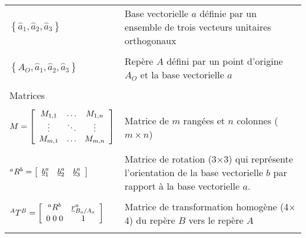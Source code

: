 \begin{center}
\begin{tabular}{p{5cm}  p{9cm}}
		$\left\{ \hat{a}_1 , \hat{a}_2 , \hat{a}_3 \right\}$  & Base vectorielle $a$ définie par un ensemble de trois vecteurs unitaires orthogonaux \\   &  \\
		$\left\{ A_O , \hat{a}_1 , \hat{a}_2 , \hat{a}_3 \right\}$  & Repère $A$ défini par un point d'origine $A_O$ et la base vectorielle $a$ \\   &  \\
		\multicolumn{2}{l}{Matrices} \\ \hline \\
		$M=\left[ \begin{array}{c c c}
					  M_{1,1} & \hdots & M_{1,n}  \\ \vdots & \ddots & \vdots \\ M_{m,1}  & \hdots & M_{m,n}
		\end{array}  \right] $
		& Matrice de $m$ rangées et $n$ colonnes ($m \times n$) \\   &  \\
		${}^aR^b = \left[ \begin{array}{c c c}
							  \underline{b}_1^a  & \underline{b}_2^a & \underline{b}_3^a
		\end{array}  \right]$            & Matrice de rotation (3$\times$3) qui représente l'orientation de la base vectorielle $b$ par rapport à la base vectorielle $a$. %
		\\   &  \\
		$^{A}T^B = \left[ \begin{array}{c c}
		{}^aR^b  & \underline{r}^a_{B_o/A_o} \\ 0 \; 0 \; 0 & 1
		\end{array}  \right] $           & Matrice de transformation homogène (4$\times$4) du repère $B$ vers le repère $A$\\   &  \\

\end{tabular}
\end{center}
